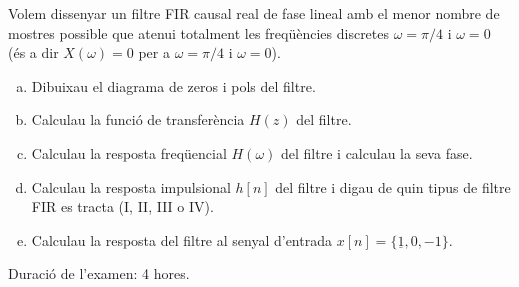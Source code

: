 \documentclass{article}[12pt]
\begin{document}
\begin{description}
Volem dissenyar un filtre FIR causal real de fase lineal amb el menor nombre de mostres possible que atenui totalment les freqüències discretes $\omega=\pi/4$ i $\omega=0$ (és a dir $X(\omega)=0$ per a $\omega=\pi/4$ i $\omega=0$).

\begin{enumerate}[a)]
\item Dibuixau el diagrama de zeros i pols del filtre.
\item Calculau la funció de transferència $H(z)$ del filtre.
\item Calculau la resposta freqüencial $H(\omega)$ del filtre i calculau la seva fase.
\item Calculau la resposta impulsional $h[n]$ del filtre i digau de quin tipus de filtre FIR es tracta (I, II, III o IV).
\item Calculau la resposta del filtre al senyal d'entrada $x[n]=\{\underline{1}, 0, -1\}$.
\end{enumerate}


\end{description}

\vskip 8cm

\noindent
Duració de l'examen: 4 hores.
\end{document}
